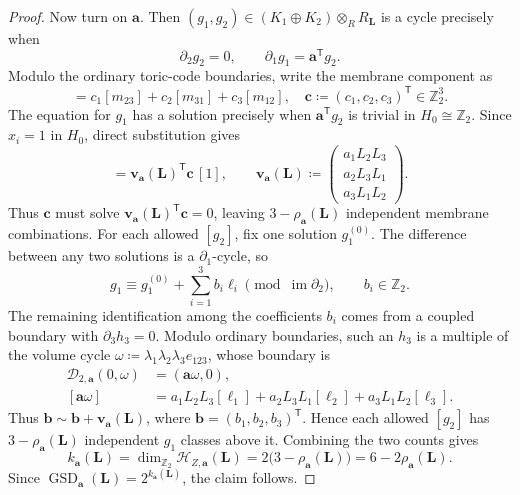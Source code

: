 \documentclass[aps,prx,english,superscriptaddress,twocolumn,tightenlines,showpacs,longbibliography,floatfix,amsfonts]{revtex4-2}
\theoremstyle{remark}
\theoremstyle{definition}
\begin{document}
\begin{proof}
	Now turn on \(\mathbf a\). Then
	\((g_1,g_2)\in(K_1\oplus K_2)\otimes_R R_{\mathbf L}\)
	is a cycle precisely when
	\begin{equation}
		\partial_2g_2=0,
		\qquad
		\partial_1g_1=\mathbf a^{\mathsf T}g_2.
	\end{equation}
	Modulo the ordinary toric-code boundaries, write the membrane component as
	\begin{equation}
		[g_2]=c_1[m_{23}]+c_2[m_{31}]+c_3[m_{12}],
		\quad
		\mathbf c\coloneqq(c_1,c_2,c_3)^{\mathsf T}\in\mathbb Z_2^3.
	\end{equation}
	The equation for \(g_1\) has a solution precisely when
	\(\mathbf a^{\mathsf T}g_2\) is trivial in
	\(H_0\cong\mathbb Z_2\).  Since \(x_i=1\) in \(H_0\), direct substitution
	gives
	\begin{equation}
		[\mathbf a^{\mathsf T}g_2]
		=\mathbf v_{\mathbf a}(\mathbf L)^{\mathsf T}\mathbf c\,[1],
		\qquad
		\mathbf v_{\mathbf a}(\mathbf L)
		\coloneqq
		\begin{pmatrix}
			a_1L_2L_3\\
			a_2L_3L_1\\
			a_3L_1L_2
		\end{pmatrix}.
	\end{equation}
	Thus \(\mathbf c\) must solve
	\(\mathbf v_{\mathbf a}(\mathbf L)^{\mathsf T}\mathbf c=0\), leaving
	\(3-\rho_{\mathbf a}(\mathbf L)\) independent membrane combinations.
	For each allowed \([g_2]\), fix one solution \(g_1^{(0)}\).  The difference
	between any two solutions is a \(\partial_1\)-cycle, so
	\begin{equation}
		g_1\equiv g_1^{(0)}+\sum_{i=1}^3b_i\ell_i
		\pmod{\operatorname{im}\partial_2},
		\qquad b_i\in\mathbb Z_2.
	\end{equation}
	The remaining identification among the coefficients \(b_i\) comes from a
	coupled boundary with \(\partial_3h_3=0\).  Modulo ordinary boundaries, such
	an \(h_3\) is a multiple of the volume cycle
	\(\omega\coloneqq\lambda_1\lambda_2\lambda_3e_{123}\), whose boundary is
	\begin{equation}
		\begin{aligned}
			\mathcal D_{2,\mathbf a}(0,\omega)&=(\mathbf a\omega,0),\\
			[\mathbf a\omega]
			&=a_1L_2L_3[\ell_1]+a_2L_3L_1[\ell_2]
			  +a_3L_1L_2[\ell_3].
		\end{aligned}
	\end{equation}
	Thus \(\mathbf b\sim\mathbf b+\mathbf v_{\mathbf a}(\mathbf L)\), where
	\(\mathbf b=(b_1,b_2,b_3)^{\mathsf T}\).  Hence each allowed \([g_2]\) has
	\(3-\rho_{\mathbf a}(\mathbf L)\) independent \(g_1\) classes above it.
	Combining the two counts gives
	\begin{equation}
		k_{\mathbf a}(\mathbf L)
		=\dim_{\mathbb Z_2}\mathcal H_{Z,\mathbf a}(\mathbf L)
		=2\bigl(3-\rho_{\mathbf a}(\mathbf L)\bigr)
		=6-2\rho_{\mathbf a}(\mathbf L).
	\end{equation}
	Since \(\operatorname{GSD}_{\mathbf a}(\mathbf L)=2^{k_{\mathbf a}(\mathbf L)}\),
	the claim follows.
\end{proof}
\end{document}
